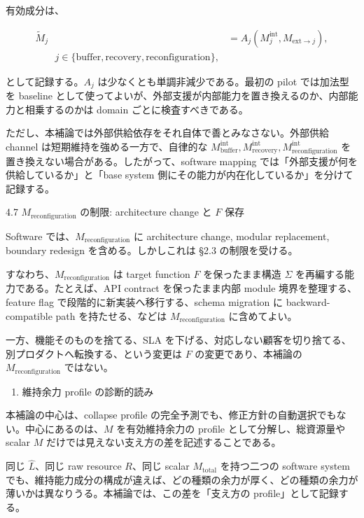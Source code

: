 \documentclass[12pt,a4paper]{article}
\begin{document}
有効成分は、

\[
\begin{aligned}
\widetilde M_{j} &= A_{j}(M_{j}^{\mathrm{int}}, M_{\mathrm{ext}\to j}), \\
\qquad j\in\{\mathrm{buffer},\mathrm{recovery},\mathrm{reconfiguration}\},
\end{aligned}
\]

として記録する。\(A_j\) は少なくとも単調非減少である。最初の pilot では加法型を baseline として使ってよいが、外部支援が内部能力を置き換えるのか、内部能力と相乗するのかは domain ごとに検査すべきである。

ただし、本補論では外部供給依存をそれ自体で善とみなさない。外部供給 channel は短期維持を強める一方で、自律的な \(M_{\mathrm{buffer}}^{\mathrm{int}}, M_{\mathrm{recovery}}^{\mathrm{int}}, M_{\mathrm{reconfiguration}}^{\mathrm{int}}\) を置き換えない場合がある。したがって、software mapping では「外部支援が何を供給しているか」と「base system 側にその能力が内在化しているか」を分けて記録する。

4.7 \(M_{\mathrm{reconfiguration}}\) の制限: architecture change と \(F\) 保存

Software では、\(M_{\mathrm{reconfiguration}}\) に architecture change, modular replacement, boundary redesign を含める。しかしこれは §2.3 の制限を受ける。

すなわち、\(M_{\mathrm{reconfiguration}}\) は target function \(F\) を保ったまま構造 \(\Sigma\) を再編する能力である。たとえば、API contract を保ったまま内部 module 境界を整理する、feature flag で段階的に新実装へ移行する、schema migration に backward-compatible path を持たせる、などは \(M_{\mathrm{reconfiguration}}\) に含めてよい。

一方、機能そのものを捨てる、SLA を下げる、対応しない顧客を切り捨てる、別プロダクトへ転換する、という変更は \(F\) の変更であり、本補論の \(M_{\mathrm{reconfiguration}}\) ではない。

\begin{enumerate}
\def\labelenumi{\arabic{enumi}.}
\setcounter{enumi}{4}
\tightlist
\item
  維持余力 profile の診断的読み
\end{enumerate}

本補論の中心は、collapse profile の完全予測でも、修正方針の自動選択でもない。中心にあるのは、\(M\) を有効維持余力の profile として分解し、総資源量や scalar \(M\) だけでは見えない支え方の差を記述することである。

同じ \(\hat L\)、同じ raw resource \(R\)、同じ scalar \(M_{\mathrm{total}}\) を持つ二つの software system でも、維持能力成分の構成が違えば、どの種類の余力が厚く、どの種類の余力が薄いかは異なりうる。本補論では、この差を「支え方の profile」として記録する。
\end{document}
